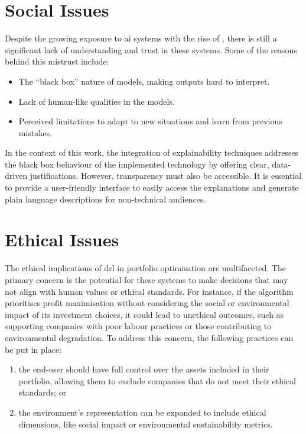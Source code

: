\section{Social Issues} \label{sec:social-issues}

Despite the growing exposure to \acrfull{ai} systems with the rise of , there is still a significant lack of understanding and trust in these systems. Some of the reasons behind this mistrust include:
\begin{itemize}
    \item The “black box” nature of models, making outputs hard to interpret.
    \item Lack of human-like qualities in the models.
    \item Perceived limitations to adapt to new situations and learn from previous mistakes.
\end{itemize}

In the context of this work, the integration of explainability techniques addresses the black box behaviour of the implemented technology by offering clear, data-driven justifications. However, transparency must also be accessible. It is essential to provide a user-friendly interface to easily access the explanations and generate plain language descriptions for non-technical audiences.

\section{Ethical Issues} \label{sec:ethical-issues}

The ethical implications of \acrshort{drl} in portfolio optimisation are multifaceted. The primary concern is the potential for these systems to make decisions that may not align with human values or ethical standards. For instance, if the algorithm prioritises profit maximisation without considering the social or environmental impact of its investment choices, it could lead to unethical outcomes, such as supporting companies with poor labour practices or those contributing to environmental degradation. To address this concern, the following practices can be put in place:
\begin{enumerate}
    \item the end-user should have full control over the assets included in their portfolio, allowing them to exclude companies that do not meet their ethical standards; or
    \item the environment's representation can be expanded to include ethical dimensions, like social impact or environmental sustainability metrics.
\end{enumerate}

